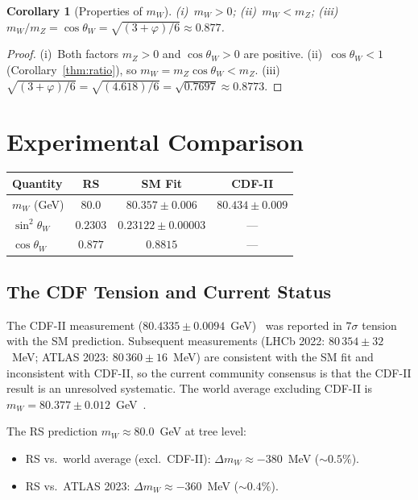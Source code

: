 \documentclass[12pt,a4paper]{article}
\newtheorem{corollary}[theorem]{Corollary}
\theoremstyle{definition}
\theoremstyle{remark}
\begin{document}
\begin{corollary}[Properties of $m_W$]
\label{thm:properties}
(i)~$m_W > 0$; \quad (ii)~$m_W < m_Z$; \quad
(iii)~$m_W/m_Z = \cos\theta_W = \sqrt{(3+\varphi)/6} \approx 0.877$.
\end{corollary}

\begin{proof}
(i)~Both factors $m_Z > 0$ and $\cos\theta_W > 0$ are positive.
(ii)~$\cos\theta_W < 1$ (Corollary~\ref{thm:ratio}), so
$m_W = m_Z\cos\theta_W < m_Z$.
(iii)~$\sqrt{(3+\varphi)/6} = \sqrt{(4.618)/6} = \sqrt{0.7697} \approx 0.8773$.
\end{proof}

\section{Experimental Comparison}
\label{sec:compare}

\begin{center}
\renewcommand{\arraystretch}{1.3}
\begin{tabular}{lccc}
\toprule
\textbf{Quantity} & \textbf{RS} & \textbf{SM Fit} & \textbf{CDF-II} \\
\midrule
$m_W$ (GeV) & $80.0$ & $80.357 \pm 0.006$ & $80.434 \pm 0.009$ \\
$\sin^2\theta_W$ & $0.2303$ & $0.23122 \pm 0.00003$ & --- \\
$\cos\theta_W$ & $0.877$ & $0.8815$ & --- \\
\bottomrule
\end{tabular}
\end{center}

\subsection{The CDF Tension and Current Status}

The CDF-II measurement ($80.4335 \pm 0.0094$~GeV)~\cite{CDF2022} was
reported in $7\sigma$ tension with the SM prediction.  Subsequent
measurements (LHCb 2022: $80\,354 \pm 32$~MeV; ATLAS 2023:
$80\,360 \pm 16$~MeV) are consistent with the SM fit and inconsistent
with CDF-II, so the current community consensus is that the CDF-II
result is an unresolved systematic.  The world average excluding CDF-II
is $m_W = 80.377 \pm 0.012$~GeV~\cite{PDG2024}.

The RS prediction $m_W \approx 80.0$~GeV at tree level:
\begin{itemize}[nosep]
  \item RS vs.\ world average (excl.\ CDF-II):
  $\Delta m_W \approx -380$~MeV ($\sim 0.5\%$).
  \item RS vs.\ ATLAS 2023:
  $\Delta m_W \approx -360$~MeV ($\sim 0.4\%$).
\end{itemize}
\end{document}

